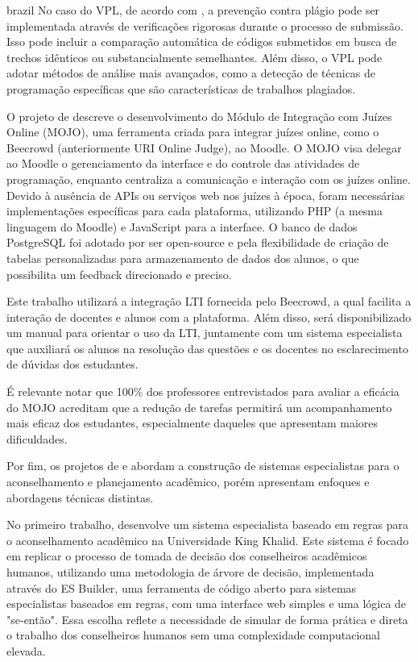 \begin{otherlanguage*}{brazil}
No caso do VPL, de acordo com \textcite{rodriguezdelpinoandroyo}, a prevenção contra plágio pode ser implementada através de verificações rigorosas durante o processo de submissão. Isso pode incluir a comparação automática de códigos submetidos em busca de trechos idênticos ou substancialmente semelhantes. Além disso, o VPL pode adotar métodos de análise mais avançados, como a detecção de técnicas de programação específicas que são características de trabalhos plagiados.

O projeto de \textcite{joseosvaldochaves} descreve o desenvolvimento do Módulo de Integração com Juízes Online (MOJO), uma ferramenta criada para integrar juízes online, como o Beecrowd (anteriormente URI Online Judge), ao Moodle. O MOJO visa delegar ao Moodle o gerenciamento da interface e do controle das atividades de programação, enquanto centraliza a comunicação e interação com os juízes online. Devido à ausência de APIs ou serviços web nos juízes à época, foram necessárias implementações específicas para cada plataforma, utilizando PHP (a mesma linguagem do Moodle) e JavaScript para a interface. O banco de dados PostgreSQL foi adotado por ser open-source e pela flexibilidade de criação de tabelas personalizadas para armazenamento de dados dos alunos, o que possibilita um feedback direcionado e preciso.

Este trabalho utilizará a integração LTI fornecida pelo Beecrowd, a qual facilita a interação de docentes e alunos com a plataforma. Além disso, será disponibilizado um manual para orientar o uso da LTI, juntamente com um sistema especialista que auxiliará os alunos na resolução das questões e os docentes no esclarecimento de dúvidas dos estudantes.

É relevante notar que 100\% dos professores entrevistados para avaliar a eficácia do MOJO acreditam que a redução de tarefas permitirá um acompanhamento mais eficaz dos estudantes, especialmente daqueles que apresentam maiores dificuldades.

Por fim, os projetos de \textcite{osmannasr} e \textcite{neildunstan} abordam a construção de sistemas especialistas para o aconselhamento e planejamento acadêmico, porém apresentam enfoques e abordagens técnicas distintas.

No primeiro trabalho, \textcite{osmannasr} desenvolve um sistema especialista baseado em regras para o aconselhamento acadêmico na Universidade King Khalid. Este sistema é focado em replicar o processo de tomada de decisão dos conselheiros acadêmicos humanos, utilizando uma metodologia de árvore de decisão, implementada através do ES Builder, uma ferramenta de código aberto para sistemas especialistas baseados em regras, com uma interface web simples e uma lógica de "se-então". Essa escolha reflete a necessidade de simular de forma prática e direta o trabalho dos conselheiros humanos sem uma complexidade computacional elevada.


\end{otherlanguage*}
